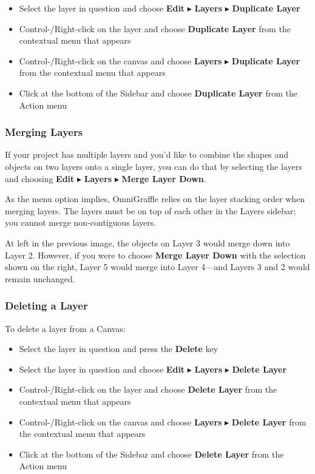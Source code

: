\documentclass[../main.tex]{subfiles}
\begin{document}
\begin{itemize}
  \item Select the layer in question and choose \textbf{Edit} $\blacktriangleright$
    \textbf{Layers} $\blacktriangleright$ \textbf{Duplicate Layer}
  \item Control-/Right-click on the layer and choose \textbf{Duplicate Layer} from the
    contextual menu that appears
  \item Control-/Right-click on the canvas and choose \textbf{Layers} $\blacktriangleright$
    \textbf{Duplicate Layer} from the contextual menu that appears
  \item Click  at the bottom of the Sidebar and
    choose \textbf{Duplicate Layer} from the Action menu
\end{itemize}

\subsubsection{Merging Layers}

If your project has multiple layers and you'd like to combine the shapes and objects on two
layers onto a single layer, you can do that by selecting the layers and choosing \textbf{Edit}
$\blacktriangleright$ \textbf{Layers} $\blacktriangleright$ \textbf{Merge Layer Down}.

As the menu option implies, OmniGraffle relies on the layer stacking order when merging layers.
The layers must be on top of each other in the Layers sidebar; you cannot merge non-contiguous
layers.


At left in the previous image, the objects on Layer 3 would merge down into Layer 2. However, if
you were to choose \textbf{Merge Layer Down} with the selection shown on the right, Layer 5
would merge into Layer 4---and Layers 3 and 2 would remain unchanged.

\subsubsection{Deleting a Layer}

To delete a layer from a Canvas:

\begin{itemize}
  \item Select the layer in question and press the \textbf{Delete} key
  \item Select the layer in question and choose \textbf{Edit} $\blacktriangleright$
    \textbf{Layers} $\blacktriangleright$ \textbf{Delete Layer}
  \item Control-/Right-click on the layer and choose \textbf{Delete Layer} from the contextual
    menu that appears
  \item Control-/Right-click on the canvas and choose \textbf{Layers} $\blacktriangleright$
    \textbf{Delete Layer} from the contextual menu that appears
  \item Click  at the bottom of the Sidebar and
    choose \textbf{Delete Layer} from the Action menu
\end{itemize}
\end{document}
